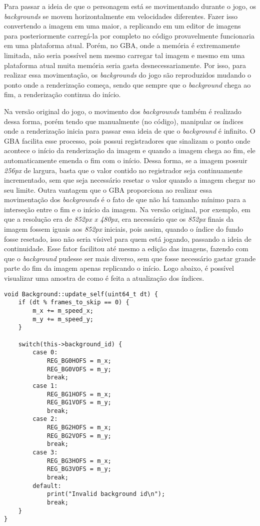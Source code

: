 Para passar a ideia de que o personagem está se movimentando durante o jogo, os \textit{backgrounds} se movem horizontalmente em velocidades diferentes. Fazer isso convertendo a imagem em uma maior, a replicando em um editor de imagens para posteriormente carregá-la por completo no código provavelmente funcionaria em uma plataforma atual. Porém, no GBA, onde a memória é extremamente limitada, não seria possível nem mesmo carregar tal imagem e mesmo em uma plataforma atual muita memória seria gasta desnecessariamente. Por isso, para realizar essa movimentação, os \textit{backgrounds} do jogo são reproduzidos mudando o ponto onde a renderização começa, sendo que sempre que o \textit{background} chega ao fim, a renderização continua do início.

Na versão original do jogo, o movimento dos \textit{backgrounds} também é realizado dessa forma, porém tendo que manualmente (no código), manipular os índices onde a renderização inicia para passar essa ideia de que o \textit{background} é infinito. O GBA facilita esse processo, pois possui registradores que sinalizam o ponto onde acontece o início da renderização da imagem e quando a imagem chega ao fim, ele automaticamente emenda o fim com o início. Dessa forma, se a imagem possuir \textit{256px} de largura, basta que o valor contido no registrador seja continuamente incrementado, sem que seja necessário resetar o valor quando a imagem chegar no seu limite. Outra vantagem que o GBA proporciona ao realizar essa movimentação dos \textit{backgrounds} é o fato de que não há tamanho mínimo para a interseção entre o fim e o início da imagem. Na versão original, por exemplo, em que a resolução era de \textit{852px x 480px}, era necessário que os \textit{852px} finais da imagem fossem iguais aos \textit{852px} iniciais, pois assim, quando o índice do fundo fosse resetado, isso não seria vísivel para quem está jogando, passando a ideia de continuidade. Esse fator facilitou até mesmo a edição das imagens, fazendo com que o \textit{background} pudesse ser mais diverso, sem que fosse necessário gastar grande parte do fim da imagem apenas replicando o início. Logo abaixo, é possível visualizar uma amostra de como é feita a atualização dos índices.

\begin{lstlisting}[caption={Método responsável por atualizar os índices de renderização do \textit{background}},label={lst:update_bg}]
void Background::update_self(uint64_t dt) {
    if (dt % frames_to_skip == 0) {
        m_x += m_speed_x;
        m_y += m_speed_y;
    }   

    switch(this->background_id) {
        case 0:
            REG_BG0HOFS = m_x;
            REG_BG0VOFS = m_y;
            break;
        case 1:
            REG_BG1HOFS = m_x;
            REG_BG1VOFS = m_y;
            break;
        case 2:
            REG_BG2HOFS = m_x;
            REG_BG2VOFS = m_y;
            break;
        case 3:
            REG_BG3HOFS = m_x;
            REG_BG3VOFS = m_y;
            break;
        default:
            print("Invalid background id\n");
            break;
    }   
}
\end{lstlisting}


